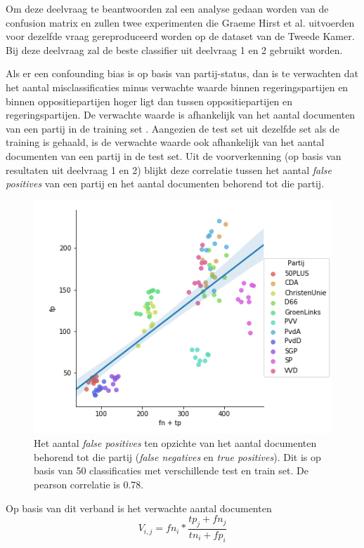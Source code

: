 Om deze deelvraag te beantwoorden zal een analyse gedaan worden van de confusion matrix en zullen twee experimenten die Graeme Hirst et al. uitvoerden voor dezelfde vraag gereproduceerd worden op de dataset van de Tweede Kamer. Bij deze deelvraag zal de beste classifier uit deelvraag 1 en 2 gebruikt worden.\par
Als er een confounding bias is op basis van partij-status, dan is te verwachten dat het aantal misclassificaties minus verwachte waarde binnen regeringspartijen en binnen oppositiepartijen hoger ligt dan tussen oppositiepartijen en regeringspartijen. De verwachte waarde is afhankelijk van het aantal documenten van een partij in de training set \cite{Sahare}. Aangezien de test set uit dezelfde set als de training is gehaald, is de verwachte waarde ook afhankelijk van het aantal documenten van een partij in de test set. Uit de voorverkenning (op basis van resultaten uit deelvraag 1 en 2) blijkt deze correlatie tussen het aantal \textit{false positives} van een partij en het aantal documenten behorend tot die partij.
\begin{figure}[H]
  \centering
    \includegraphics[width=0.60\paperwidth]{Verslag/Tables/Correlation.png}
\caption{Het aantal \textit{false positives} ten opzichte van het aantal documenten behorend tot die partij (\textit{false negatives} en \textit{true positives}). Dit is op basis van 50 classificaties met verschillende test en train set. De pearson correlatie is 0.78.}
\label{fig:correlation}
\end{figure}
Op basis van dit verband is het verwachte aantal documenten
\begin{equation}
V_{i,j}  = fn_i *  \frac{tp_{j}+fn_{j}}{tn_{i}+fp_{i}}
\end{equation}
